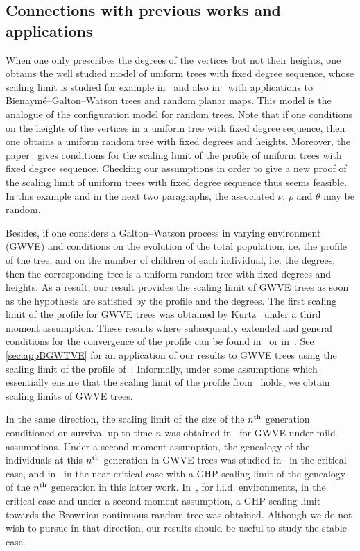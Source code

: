 \documentclass[AHL,Unicode,published]{cedram}
\newcommand{\1}{\mathbbm{1}}
\begin{document}
\subsection{Connections with previous works and applications}

When one only prescribes the degrees of the vertices but not their heights, one obtains the well studied model of uniform trees with fixed degree sequence, whose scaling limit is studied for example in~\cite{BM14,BR21} and also in~\cite{Mar18} with applications to Bienaymé--Galton--Watson trees and random planar maps. This model is the analogue of the configuration model for random trees. Note that if one conditions on the heights of the vertices in a uniform tree with fixed degree sequence, then one obtains a uniform random tree with fixed degrees and heights. Moreover, the paper~\cite{AUB20} gives conditions for the scaling limit of the profile of uniform trees with fixed degree sequence. Checking our assumptions in order to give a new proof of the scaling limit of uniform trees with fixed degree sequence thus seems feasible. In this example and in the next two paragraphs, the associated $\nu$, $\rho$ and $\theta$ may be random.

Besides, if one considers a Galton--Watson process in varying environment (GWVE) and conditions on the evolution of the total population, i.e. the profile of the tree, and on the number of children of each individual, i.e. the degrees, then the corresponding tree is a uniform random tree with fixed degrees and heights. As a result, our result provides the scaling limit of GWVE trees as soon as the hypothesis are satisfied by the profile and the degrees. The first scaling limit of the profile for GWVE trees was obtained by Kurtz~\cite{Kur78} under a third moment assumption. These results where subsequently extended and general conditions for the convergence of the profile can be found in~\cite{BS15} or in~\cite{FLL22}. See \cref{sec:appBGWTVE} for an application of our results to GWVE trees using the scaling limit of the profile of~\cite{BS15}. Informally, under some assumptions which essentially ensure that the scaling limit of the profile from~\cite{BS15} holds, we obtain scaling limits of GWVE trees.

In the same direction, the scaling limit of the size of the $n^{\rm th}$ generation conditioned on survival up to time $n$ was obtained in~\cite{Ker20} for GWVE under mild assumptions. Under a second moment assumption, the genealogy of the individuals at this $n^{\rm th}$ generation in GWVE trees was studied in~\cite{HPP22} in the critical case, and in~\cite{BFRS22} in the near critical case with a GHP scaling limit of the genealogy of the $n^{\rm th}$ generation in this latter work. In~\cite{CKKM22}, for i.i.d. environments, in the critical case and under a second moment assumption, a GHP scaling limit towards the Brownian continuous random tree was obtained. Although we do not wish to pursue in that direction, our results should be useful to study the stable case.
\end{document}
